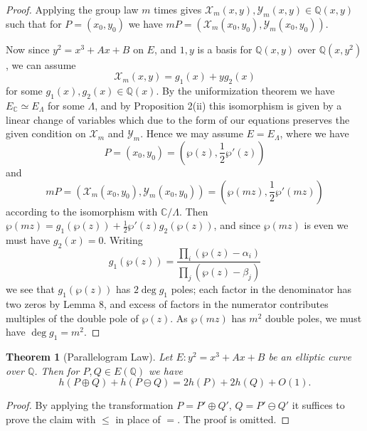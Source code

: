 \documentclass[a4paper]{article}
\theoremstyle{plain}
\newtheorem{theorem}{Theorem}
\theoremstyle{remark}
\theoremstyle{definition}
\newcommand{\X}{\mathcal{X}}
\newcommand{\Y}{\mathcal{Y}}
\newcommand{\Q}{\mathbb{Q}}
\newcommand{\C}{\mathbb{C}}
\begin{document}
\begin{proof}
    Applying the group law $m$ times gives $\X_m(x,y),\Y_m(x,y)\in\Q(x,y)$ such
    that for $P=(x_0,y_0)$ we have $mP=(\X_m(x_0,y_0),\Y_m(x_0,y_0))$.

    Now since $y^2=x^3+Ax+B$ on $E$, and $1,y$ is a basis for $\Q(x,y)$ over
    $\Q(x,y^2)$, we can assume
    \begin{equation*}
        \X_m(x,y) = g_1(x) + yg_2(x)
    \end{equation*}
    for some $g_1(x),g_2(x)\in\Q(x)$. By the uniformization theorem we have
    $E_\C\simeq E_\Lambda$ for some $\Lambda$, and by Proposition 2(ii) this
    isomorphism is given by a linear change of variables which due to the form
    of our equations preserves the given condition on $\X_m$ and $\Y_m$. Hence
    we may assume $E=E_\Lambda$, where we have
    \begin{equation*}
        P = (x_0,y_0) = (\wp(z),\frac{1}{2}\wp'(z))
    \end{equation*}
    and
    \begin{equation*}
        mP = (\X_m(x_0,y_0),\Y_m(x_0,y_0)) = (\wp(mz),\frac{1}{2}\wp'(mz))
    \end{equation*}
    according to the isomorphism with $\C/\Lambda$. Then
    $\wp(mz)=g_1(\wp(z))+\frac{1}{2}\wp'(z)g_2(\wp(z))$, and since
    $\wp(mz)$ is even we must have $g_2(x)=0$. Writing
    \begin{equation*}
        g_1(\wp(z)) = \frac{\prod_i(\wp(z)-\alpha_i)}{\prod_j(\wp(z)-\beta_j)}
    \end{equation*}
    we see that $g_1(\wp(z))$ has $2\deg g_1$ poles; each factor in the
    denominator has two zeros by Lemma 8, and excess of factors in the numerator
    contributes multiples of the double pole of $\wp(z)$. As $\wp(mz)$ has $m^2$
    double poles, we must have $\deg g_1=m^2$.
\end{proof}

\begin{theorem}[Parallelogram Law]
    Let $E:y^2=x^3+Ax+B$ be an elliptic curve over $\Q$. Then for $P,Q\in E(\Q)$
    we have
    \begin{equation*}
        h(P\oplus Q) + h(P\ominus Q) = 2h(P) + 2h(Q) + O(1).
    \end{equation*}
\end{theorem}

\begin{proof}
    By applying the transformation $P=P'\oplus Q'$, $Q=P'\ominus Q'$ it suffices
    to prove the claim with $\le$ in place of $=$. The proof is omitted.
\end{proof}
\end{document}
